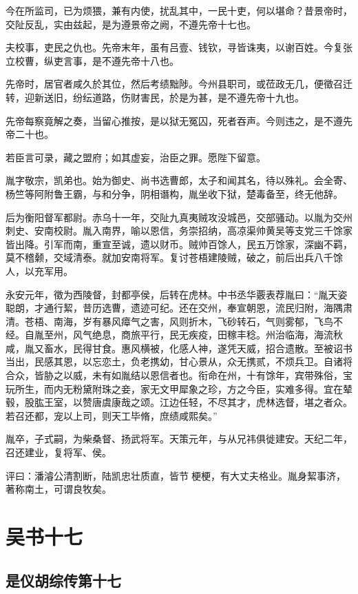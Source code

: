 \documentclass[12pt,UTF8]{ctexbook}
\begin{document}
今在所监司，已为烦猥，兼有内使，扰乱其中，一民十吏，何以堪命？昔景帝时，交阯反乱，实由兹起，是为遵景帝之阙，不遵先帝十七也。

夫校事，吏民之仇也。先帝末年，虽有吕壹、钱钦，寻皆诛夷，以谢百姓。今复张立校曹，纵吏言事，是不遵先帝十八也。

先帝时，居官者咸久於其位，然后考绩黜陟。今州县职司，或莅政无几，便徵召迁转，迎新送旧，纷纭道路，伤财害民，於是为甚，是不遵先帝十九也。

先帝每察竟解之奏，当留心推按，是以狱无冤囚，死者吞声。今则违之，是不遵先帝二十也。

若臣言可录，藏之盟府；如其虚妄，治臣之罪。愿陛下留意。

胤字敬宗，凯弟也。始为御史、尚书选曹郎，太子和闻其名，待以殊礼。会全寄、杨竺等阿附鲁王霸，与和分争，阴相谮构，胤坐收下狱，楚毒备至，终无他辞。

后为衡阳督军都尉。赤乌十一年，交阯九真夷贼攻没城邑，交部骚动。以胤为交州刺史、安南校尉。胤入南界，喻以恩信，务崇招纳，高凉渠帅黄吴等支党三千馀家皆出降。引军而南，重宣至诚，遗以财币。贼帅百馀人，民五万馀家，深幽不羁，莫不稽颡，交域清泰。就加安南将军。复讨苍梧建陵贼，破之，前后出兵八千馀人，以充军用。

永安元年，徵为西陵督，封都亭侯，后转在虎林。中书丞华覈表荐胤曰：“胤天姿聪朗，才通行絜，昔历选曹，遗迹可纪。还在交州，奉宣朝恩，流民归附，海隅肃清。苍梧、南海，岁有暴风瘴气之害，风则折木，飞砂转石，气则雾郁，飞鸟不经。自胤至州，风气绝息，商旅平行，民无疾疫，田稼丰稔。州治临海，海流秋咸，胤又畜水，民得甘食。惠风横被，化感人神，遂凭天威，招合遗散。至被诏书当出，民感其恩，以忘恋土，负老携幼，甘心景从，众无携贰，不烦兵卫。自诸将合众，皆胁之以威，未有如胤结以恩信者也。衔命在州，十有馀年，宾带殊俗，宝玩所生，而内无粉黛附珠之妾，家无文甲犀象之珍，方之今臣，实难多得。宜在辇毂，股肱王室，以赞唐虞康哉之颂。江边任轻，不尽其才，虎林选督，堪之者众。若召还都，宠以上司，则天工毕脩，庶绩咸熙矣。”

胤卒，子式嗣，为柴桑督、扬武将军。天策元年，与从兄祎俱徙建安。天纪二年，召还建业，复将军、侯。

评曰：潘濬公清割断，陆凯忠壮质直，皆节梗梗，有大丈夫格业。胤身絜事济，著称南土，可谓良牧矣。

\part{吴书十七}
\chapter{是仪胡综传第十七}
\end{document}
